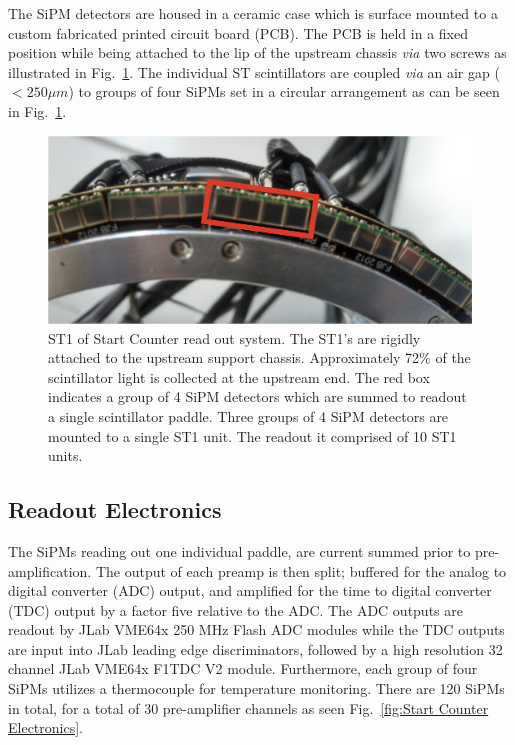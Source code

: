 The SiPM detectors are housed in a ceramic case which is surface mounted to a custom fabricated printed circuit board (PCB).  The PCB is held in a fixed position while being attached to the lip of the upstream chassis \emph{via} two screws as illustrated in Fig.~\ref{fig:st1_mounted}.  The individual ST scintillators are coupled \emph{via} an air gap ($< 250 \mu m$) to groups of four SiPMs set in a circular arrangement as can be seen in Fig.~\ref{fig:st1_mounted}.
	\begin{figure}[!htb]
		\centering
		\includegraphics[width=1.0\columnwidth]{design/figs/st1_mounted_v2}
		\caption{ST1 of Start Counter read out system. The ST1's are rigidly attached to the upstream support chassis.  Approximately 72\% of the scintillator light is collected at the upstream end.  The red box indicates a group of 4 SiPM detectors which are summed to readout a single scintillator paddle.  Three groups of 4 SiPM detectors are mounted to a single ST1 unit. The readout it comprised of 10 ST1 units.}
		\label{fig:st1_mounted}
	\end{figure}

\subsection{Readout Electronics} \label{sec:design_electronics}

The SiPMs reading out one individual paddle, are current summed prior to pre-amplification.  The output of each preamp is then split; buffered for the analog to digital converter (ADC) output, and amplified for the time to digital converter (TDC) output by a factor five relative to the ADC.  The ADC outputs are readout by JLab VME64x 250 MHz Flash ADC modules while the TDC outputs are input into JLab leading edge discriminators, followed by a high resolution 32 channel JLab VME64x F1TDC V2 module.  Furthermore, each group of four SiPMs utilizes a thermocouple for temperature monitoring. There are 120 SiPMs in total, for a total of 30 pre-amplifier channels as seen Fig.~\ref{fig:Start Counter Electronics}.

